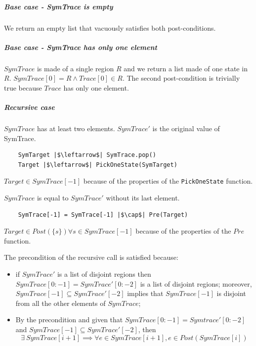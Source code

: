 \documentclass[12pt]{article}
\begin{document}
    \subparagraph*{Base case - SymTrace is empty}
    We return an empty list that vacuously satisfies both post-conditions.

    \subparagraph*{Base case - SymTrace has only one element}

    $SymTrace$ is made of a single region $R$ and we return a list made of one state in $R$.
    $SymTrace[0] = R \wedge Trace[0] \in R$.
    The second post-condition is trivially true because $Trace$ has only one element.

    \subparagraph*{Recursive case}
    $SymTrace$ has at least two elements.
    $SymTrace'$ is the original value of SymTrace.

    \begin{verbatim}
    SymTarget |$\leftarrow$| SymTrace.pop()
    Target |$\leftarrow$| PickOneState(SymTarget)
    \end{verbatim}

    $Target \in SymTrace[-1]$ because of the properties of the \texttt{PickOneState} function.

    $SymTrace$ is equal to $SymTrace'$ without its last element.
     
    \begin{verbatim}
    SymTrace[-1] = SymTrace[-1] |$\cap$| Pre(Target)
    \end{verbatim}

    $Target \in Post(\{s\}) \forall s \in SymTrace[-1]$ because of the properties of the $Pre$ function.

    The precondition of the recursive call is satisfied because:
    \begin{itemize}
        \item if $SymTrace'$ is a list of disjoint regions then $SymTrace[0:-1] = SymTrace'[0:-2]$ is a list of disjoint regions;
        moreover, $SymTrace[-1] \subseteq SymTrace'[-2]$ implies that $SymTrace[-1]$ is disjoint from all the other elements of $SymTrace$;
        \item By the precondition and given that $SymTrace[0:-1] = Symtrace'[0:-2]$ and $SymTrace[-1] \subseteq SymTrace'[-2] $, then
        \begin{equation*}
            \exists\ SymTrace[i+1] \implies \forall e \in SymTrace[i+1], e \in Post(SymTrace[i])
        \end{equation*}
    \end{itemize}
\end{document}
